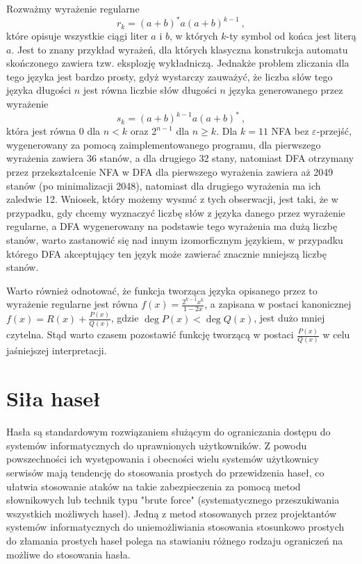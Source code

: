 Rozważmy wyrażenie regularne
$$r_k=(a+b)^*a(a+b)^{k-1}~,$$
które opisuje wszystkie ciągi liter $a$ i $b$, w których $k$-ty symbol od końca jest literą $a$. Jest to znany przykład wyrażeń, dla których klasyczna konstrukcja automatu skończonego zawiera tzw. eksplozję wykładniczą. Jednakże problem zliczania dla tego języka jest bardzo prosty, gdyż wystarczy zauważyć, że liczba słów tego języka długości $n$ jest równa liczbie słów długości $n$ języka generowanego przez wyrażenie
$$s_k=(a+b)^{k-1}a(a+b)^*~,$$
która jest równa $0$ dla $n<k$ oraz $2^{n-1}$ dla $n\geq k$. Dla $k=11$ NFA bez $\varepsilon$-przejść, wygenerowany za pomocą zaimplementowanego programu, dla pierwszego wyrażenia zawiera 36 stanów, a dla drugiego 32 stany, natomiast DFA otrzymany przez przekształcenie NFA w DFA dla pierwszego wyrażenia zawiera aż 2049 stanów (po minimalizacji 2048), natomiast dla drugiego wyrażenia ma ich zaledwie 12. Wniosek, który możemy wysnuć z tych obserwacji, jest taki, że w przypadku, gdy chcemy wyznaczyć liczbę słów z języka danego przez wyrażenie regularne, a DFA wygenerowany na podstawie tego wyrażenia ma dużą liczbę stanów, warto zastanowić się nad innym izomorficznym językiem, w przypadku którego DFA akceptujący ten język może zawierać znacznie mniejszą liczbę stanów.

Warto również odnotować, że funkcja tworząca języka opisanego przez to wyrażenie regularne jest równa $f(x)=\frac{2^{k-1}x^k}{1-2x}$, a zapisana w postaci kanonicznej $f(x)=R(x)+\frac{P(x)}{Q(x)}$, gdzie $\deg{P(x)}<\deg{Q(x)}$, jest dużo mniej czytelna. Stąd warto czasem pozostawić funkcję tworzącą w postaci $\frac{P(x)}{Q(x)}$ w celu jaśniejszej interpretacji.

\section{Siła haseł}

Hasła są standardowym rozwiązaniem służącym do ograniczania dostępu do systemów informatycznych do uprawnionych użytkowników. Z powodu powszechności ich występowania i obecności wielu systemów użytkownicy serwisów mają tendencję do stosowania prostych do przewidzenia haseł, co ułatwia stosowanie ataków na takie zabezpieczenia za pomocą metod słownikowych lub technik typu "brute force" (systematycznego przeszukiwania wszystkich możliwych haseł). Jedną z metod stosowanych przez projektantów systemów informatycznych do uniemożliwiania stosowania stosunkowo prostych do złamania prostych haseł polega na stawianiu różnego rodzaju ograniczeń na możliwe do stosowania hasła.    

